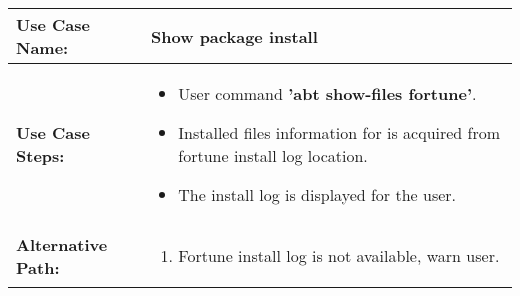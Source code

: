 \medskip

\begin{tabularx}{\linewidth}{|l|X|}
\hline
\textbf{Use Case Name:} & \textbf{Show package install} \\
\hline
\textbf{Use Case Steps:} & 
\begin{minipage}{\linewidth} 
  \vspace{0.05em}
  \begin{itemize}
    \item User command \textbf{'abt show-files fortune'}.
    \item Installed files information for is acquired from fortune install log location.
    \item The install log is displayed for the user.
  \end{itemize}
  \vspace{0.05em}
\end{minipage}
\\
\hline 
\textbf{Alternative Path:} &
\begin{minipage}{\linewidth}
  \vspace{0.05em} 
  \begin{enumerate}
    \item Fortune install log is not available, warn user.
  \end{enumerate}
  \vspace{0.05em} 
\end{minipage}
\\
\hline
\end{tabularx}